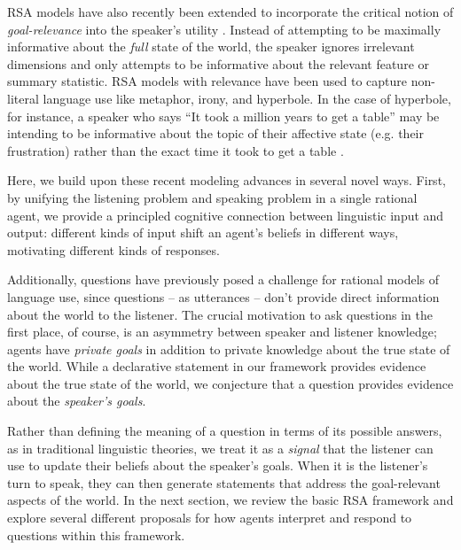 \documentclass[12pt, floatsintext, jou]{apa6}
\begin{document}
RSA models have also recently been extended to incorporate the critical notion of \emph{goal-relevance} into the speaker's utility \cite{Roberts96_InformationStructureDiscourse, WilsonSperber12_MeaningRelevance}. Instead of attempting to be maximally informative about the \emph{full} state of the world, the speaker ignores irrelevant dimensions and only attempts to be informative about the relevant feature or summary statistic. 
RSA models with relevance have been used to capture non-literal language use like metaphor, irony, and hyperbole. 
In the case of hyperbole, for instance, a speaker who says ``It took a million years to get a table'' may be intending to be informative about the topic of their affective state (e.g. their frustration) rather than the exact time it took to get a table \cite{KaoWuBergenGoodman14_NonliteralNumberWords}.

Here, we build upon these recent modeling advances in several novel ways. 
First, by unifying the listening problem and speaking problem in a single rational agent, we provide a principled cognitive connection between linguistic input and output: different kinds of input shift an agent's beliefs in different ways, motivating different kinds of responses. 

Additionally, questions have previously posed a challenge for rational models of language use, since questions -- as utterances -- don't provide direct information about the world to the listener.
The crucial motivation to ask questions in the first place, of course, is an asymmetry between speaker and listener knowledge; agents have \emph{private goals} in addition to private knowledge about the true state of the world. 
While a declarative statement in our framework provides evidence about the true state of the world, we conjecture that a question provides evidence about the \emph{speaker's goals}. 

Rather than defining the meaning of a question in terms of its possible answers, as in traditional linguistic theories, we treat it as a \emph{signal} that the listener can use to update their beliefs about the speaker's goals. 
When it is the listener's turn to speak, they can then generate statements that address the goal-relevant aspects of the world. In the next section, we review the basic RSA framework and explore several different proposals for how agents interpret and respond to questions within this framework.
\end{document}
